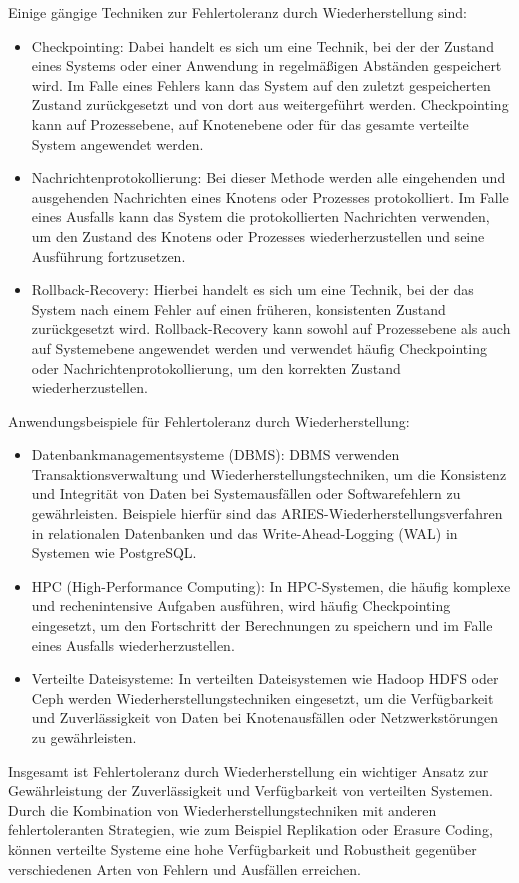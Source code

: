 Einige gängige Techniken zur Fehlertoleranz durch Wiederherstellung sind:
\begin{itemize}
\item Checkpointing: Dabei handelt es sich um eine Technik, bei der der Zustand eines Systems oder einer Anwendung in regelmäßigen Abständen gespeichert wird. Im Falle eines Fehlers kann das System auf den zuletzt gespeicherten Zustand zurückgesetzt und von dort aus weitergeführt werden. Checkpointing kann auf Prozessebene, auf Knotenebene oder für das gesamte verteilte System angewendet werden.
\item Nachrichtenprotokollierung: Bei dieser Methode werden alle eingehenden und ausgehenden Nachrichten eines Knotens oder Prozesses protokolliert. Im Falle eines Ausfalls kann das System die protokollierten Nachrichten verwenden, um den Zustand des Knotens oder Prozesses wiederherzustellen und seine Ausführung fortzusetzen.
\item Rollback-Recovery: Hierbei handelt es sich um eine Technik, bei der das System nach einem Fehler auf einen früheren, konsistenten Zustand zurückgesetzt wird. Rollback-Recovery kann sowohl auf Prozessebene als auch auf Systemebene angewendet werden und verwendet häufig Checkpointing oder Nachrichtenprotokollierung, um den korrekten Zustand wiederherzustellen.
\end{itemize}  
Anwendungsbeispiele für Fehlertoleranz durch Wiederherstellung:
\begin{itemize}
\item Datenbankmanagementsysteme (DBMS): DBMS verwenden Transaktionsverwaltung und Wiederherstellungstechniken, um die Konsistenz und Integrität von Daten bei Systemausfällen oder Softwarefehlern zu gewährleisten. Beispiele hierfür sind das ARIES-Wiederherstellungsverfahren in relationalen Datenbanken und das Write-Ahead-Logging (WAL) in Systemen wie PostgreSQL.
\item HPC (High-Performance Computing): In HPC-Systemen, die häufig komplexe und rechenintensive Aufgaben ausführen, wird häufig Checkpointing eingesetzt, um den Fortschritt der Berechnungen zu speichern und im Falle eines Ausfalls wiederherzustellen.
\item Verteilte Dateisysteme: In verteilten Dateisystemen wie Hadoop HDFS oder Ceph werden Wiederherstellungstechniken eingesetzt, um die Verfügbarkeit und Zuverlässigkeit von Daten bei Knotenausfällen oder Netzwerkstörungen zu gewährleisten.
\end{itemize} 
Insgesamt ist Fehlertoleranz durch Wiederherstellung ein wichtiger Ansatz zur Gewährleistung der Zuverlässigkeit und Verfügbarkeit von verteilten Systemen. Durch die Kombination von Wiederherstellungstechniken mit anderen fehlertoleranten Strategien, wie zum Beispiel Replikation oder Erasure Coding, können verteilte Systeme eine hohe Verfügbarkeit und Robustheit gegenüber verschiedenen Arten von Fehlern und Ausfällen erreichen.
